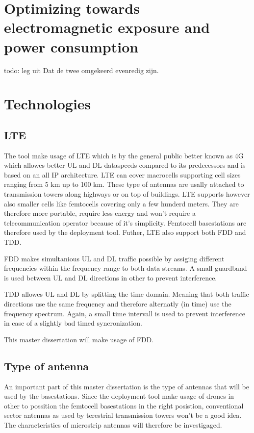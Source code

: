 \section{Optimizing towards electromagnetic exposure and power consumption}
todo: leg uit Dat de twee omgekeerd evenredig zijn.



\section{Technologies}
\subsection{LTE}
The tool make usage of \gls{LTE} which is by the general public better known as 4G which allowes better \gls{UL} and \gls{DL} dataspeeds 
compared to its predecessors and is based on an all IP architecture. LTE can cover macrocells supporting cell sizes ranging from 5 km up to 100 km. 
These type of antennas are usally attached to transmission towers along highways or on top of buildings. LTE supports however also smaller cells like
femtocells covering only a few hunderd meters. They are therefore more portable, require less energy and won't require a telecommunication operator because
of it's simplicity. Femtocell basestations are therefore used by the deployment tool.
Futher, \gls{LTE} also support both \gls{FDD} and \gls{TDD}.

\gls{FDD} makes simultanious \gls{UL} and \gls{DL} traffic possible by assiging different frequencies within the frequency range 
to both data streams. A small guardband is used between \gls{UL} and \gls{DL} directions in other to prevent interference.

\gls{TDD} allowes  \gls{UL} and \gls{DL} by splitting the time domain. Meaning that both traffic directions use the same frequency and therefore
alternatly (in time) use the frequency spectrum. Again, a small time intervall is used to prevent interference in case of a slightly bad timed syncronization.

This master dissertation will make usage of \gls{FDD}.


\subsection{Type of antenna} %

An important part of this master dissertation is the type of antennas that will be used by the basestations. Since the deployment tool make usage
of drones in other to possition the femtocell basestations in the right posistion,  conventional 
sector antennas as used by terestrial transmission towers won't be a good idea. The characteristics of microstrip antennas will therefore be investigaged.

